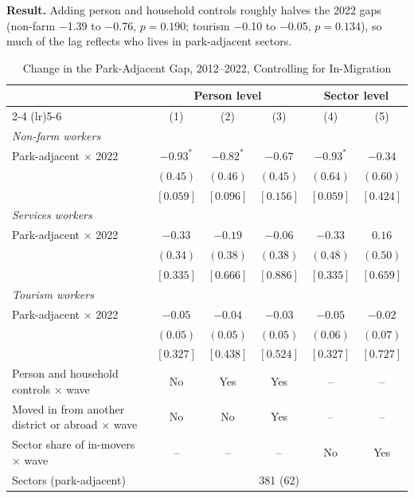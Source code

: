 \documentclass[11pt]{article}
\begin{document}
\textbf{Result.} Adding person and household controls roughly halves the 2022 gaps (non-farm $-$1.39 to $-$0.76, $p=0.190$; tourism $-$0.10 to $-$0.05, $p=0.134$), so much of the lag reflects who lives in park-adjacent sectors.
\clearpage
\begin{table}[H]
\centering
\caption{Change in the Park-Adjacent Gap, 2012--2022, Controlling for In-Migration}
\label{tab:census_park_gap_migration}
\begin{tabular}{lccccc}
\toprule
 & \multicolumn{3}{c}{Person level} & \multicolumn{2}{c}{Sector level} \\
\cmidrule(lr){2-4} \cmidrule(lr){5-6}
 & (1) & (2) & (3) & (4) & (5) \\
\midrule
\textit{Non-farm workers} & & & & & \\
Park-adjacent $\times$ 2022 & $-0.93^{*}$ & $-0.82^{*}$ & $-0.67$ & $-0.93^{*}$ & $-0.34$ \\
 & $(0.45)$ & $(0.46)$ & $(0.45)$ & $(0.64)$ & $(0.60)$ \\
 & $[0.059]$ & $[0.096]$ & $[0.156]$ & $[0.059]$ & $[0.424]$ \\
\textit{Services workers} & & & & & \\
Park-adjacent $\times$ 2022 & $-0.33$ & $-0.19$ & $-0.06$ & $-0.33$ & $0.16$ \\
 & $(0.34)$ & $(0.38)$ & $(0.38)$ & $(0.48)$ & $(0.50)$ \\
 & $[0.335]$ & $[0.666]$ & $[0.886]$ & $[0.335]$ & $[0.659]$ \\
\textit{Tourism workers} & & & & & \\
Park-adjacent $\times$ 2022 & $-0.05$ & $-0.04$ & $-0.03$ & $-0.05$ & $-0.02$ \\
 & $(0.05)$ & $(0.05)$ & $(0.05)$ & $(0.06)$ & $(0.07)$ \\
 & $[0.327]$ & $[0.438]$ & $[0.524]$ & $[0.327]$ & $[0.727]$ \\
\midrule
Person and household controls $\times$ wave & No & Yes & Yes & -- & -- \\
Moved in from another district or abroad $\times$ wave & No & No & Yes & -- & -- \\
Sector share of in-movers $\times$ wave & -- & -- & -- & No & Yes \\
Sectors (park-adjacent) & \multicolumn{5}{c}{381 (62)} \\
\bottomrule
\end{tabular}
\begin{minipage}{0.95\textwidth}\footnotesize

\end{minipage}
\end{table}
\end{document}
